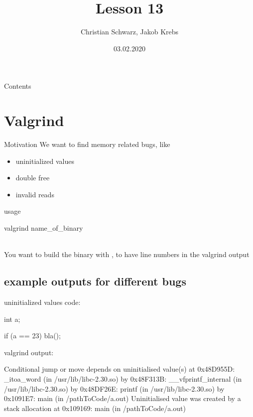 \documentclass[10pt,graphics,aspectratio=169,table]{beamer}
\title{Lesson 13}
\author{Christian Schwarz, Jakob Krebs}
\date{03.02.2020}
\begin{document}
\maketitle

\begin{frame}{Contents}
    \tableofcontents
\end{frame}
\section{Valgrind}
\begin{frame}[fragile]{Motivation}
We want to find memory related bugs, like

\begin{itemize}
\item uninitialized values
\item double free
\item invalid reads
\end{itemize}
\end{frame}

\begin{frame}[fragile]{usage}
\begin{codeblock}
valgrind name_of_binary
\end{codeblock}\\
You want to build the binary with , to have line numbers in the valgrind output
\end{frame}

\subsection{example outputs for different bugs}

\begin{frame}[fragile]{uninitialized values}
code:
\begin{codeblock}
int a;

if (a == 23) bla();
\end{codeblock}

valgrind output:

\begin{codeblock}
Conditional jump or move depends on uninitialised value(s)
   at 0x48D955D: _itoa_word (in /usr/lib/libc-2.30.so)
   by 0x48F313B: __vfprintf_internal (in /usr/lib/libc-2.30.so)
   by 0x48DF26E: printf (in /usr/lib/libc-2.30.so)
   by 0x1091E7: main (in /pathToCode/a.out)
 Uninitialised value was created by a stack allocation
   at 0x109169: main (in /pathToCode/a.out)
\end{codeblock}
\end{frame}
\end{document}

